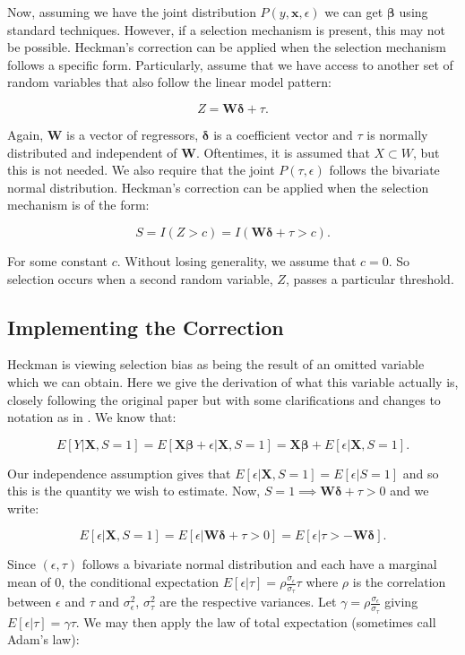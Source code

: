 \documentclass[12pt,twoside]{reedthesis}
\theoremstyle{definition}
\begin{document}
Now, assuming we have the joint distribution $P(y, \mathbf{x}, \epsilon)$ we can get $\mathbf{\beta}$ using standard techniques. However, if a selection mechanism is present, this may not be possible. Heckman's correction can be applied when the selection mechanism follows a specific form. Particularly, assume that we have access to another set of random variables that also follow the linear model pattern: 

$$Z = \mathbf{W} \boldsymbol{\delta} + \tau.$$

Again, $\mathbf{W}$ is a vector of regressors, $\boldsymbol{\delta}$ is a coefficient vector and $\tau$ is normally distributed and independent of $\mathbf{W}$. Oftentimes, it is assumed that $X \subset W$, but this is not needed. We also require that the joint $P(\tau, \epsilon)$ follows the bivariate normal distribution. Heckman's correction can be applied when the selection mechanism is of the form:

$$S = I(Z > c) = I( \mathbf{W} \boldsymbol{\delta} + \tau > c).$$ 

For some constant $c$. Without losing generality, we assume that $c = 0$. So selection occurs when a second random variable, $Z$,  passes a particular threshold. 

\subsection{Implementing the Correction}

Heckman is viewing selection bias as being the result of an omitted variable which we can obtain. Here we give the derivation of what this variable actually is, closely following the original paper but with some clarifications and changes to notation as in \citep{Jin}. We know that:

$$E[Y | \mathbf{X}, S = 1] = E[ \mathbf{X} \boldsymbol{\beta} + \epsilon | \mathbf{X}, S = 1] = \mathbf{X} \boldsymbol{\beta} + E[\epsilon |  \mathbf{X}, S = 1].$$

Our independence assumption gives that $ E[\epsilon |  \mathbf{X}, S = 1] =  E[\epsilon |  S = 1]$ and so this is the quantity we wish to estimate. Now, $S=1 \implies  \mathbf{W} \boldsymbol{\delta} + \tau > 0$ and we write:  

$$E[\epsilon |  \mathbf{X}, S = 1] = E[\epsilon | \mathbf{W} \boldsymbol{\delta}+ \tau > 0] = E[\epsilon |  \tau > - \mathbf{W} \boldsymbol{\delta}].$$

Since $(\epsilon, \tau)$ follows a bivariate normal distribution and each have a marginal mean of $0$, the conditional expectation $E[\epsilon | \tau] = \rho \frac{\sigma_{\epsilon}}{\sigma_{\tau}} \tau$ where $\rho$ is the correlation between $\epsilon$ and $\tau$ and $\sigma^2_{\epsilon}$, $\sigma^2_{\tau}$ are the respective variances. Let $\gamma  = \rho \frac{\sigma_{\epsilon}}{\sigma_{\tau}}$ giving $E[\epsilon | \tau] = \gamma \tau$. We may then apply the law of total expectation (sometimes call Adam's law):
\end{document}
